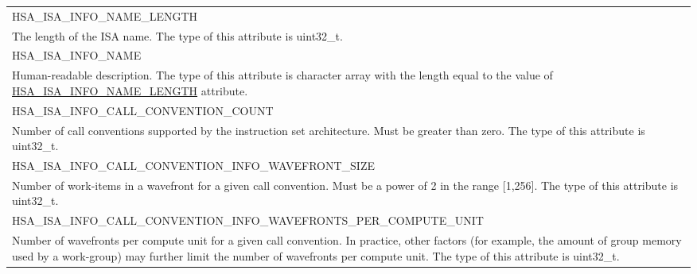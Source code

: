 \documentclass[final,oneside]{book}
\newcommand{\reftyp}[1]{#1}
\newcommand{\refenu}[1]{\reftyp{#1}}
\begin{document}
\begin{longtable}{@{\hspace{2em}}p{\linewidth-2em}}
\hspace{-2em}\refenu{HSA_\-ISA_\-INFO_\-NAME_\-LENGTH}\\The length of the ISA name. The type of this attribute is uint32_\-t.\\[2mm]
\hspace{-2em}\refenu{HSA_\-ISA_\-INFO_\-NAME}\\Human-readable description. The type of this attribute is character array with the length equal to the value of \hyperlink{group__code-object_1ggaa8a09719dffad53bb3908b11ed25c1e4aca73b418e6abed877d1d8a318ebb6d37}{HSA_\-ISA_\-INFO_\-NAME_\-LENGTH} attribute.\\[2mm]
\hspace{-2em}\refenu{HSA_\-ISA_\-INFO_\-CALL_\-CONVENTION_\-COUNT}\\Number of call conventions supported by the instruction set architecture. Must be greater than zero. The type of this attribute is uint32_\-t.\\[2mm]
\hspace{-2em}\refenu{HSA_\-ISA_\-INFO_\-CALL_\-CONVENTION_\-INFO_\-WAVEFRONT_\-SIZE}\\Number of work-items in a wavefront for a given call convention. Must be a power of 2 in the range [1,256]. The type of this attribute is uint32_\-t.\\[2mm]
\hspace{-2em}\refenu{HSA_\-ISA_\-INFO_\-CALL_\-CONVENTION_\-INFO_\-WAVEFRONTS_\-PER_\-COMPUTE_\-UNIT}\\Number of wavefronts per compute unit for a given call convention. In practice, other factors (for example, the amount of group memory used by a work-group) may further limit the number of wavefronts per compute unit. The type of this attribute is uint32_\-t.
\end{longtable}
\end{document}
